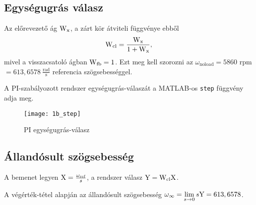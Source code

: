 
\subsection{Egységugrás válasz}

Az előrevezető ág $\mathrm{W}_\text{x}$, a zárt kör átviteli függvénye ebből
\begin{equation}
	\mathrm{W}_\text{cl} = \frac{\mathrm{W}_\text{x}}{1+\mathrm{W}_\text{x}},
\end{equation}
mivel a visszacsatoló ágban $\mathrm{W}_\text{fb}=1$.
Ezt meg kell szorozni az $\omega_\text{noload} = 5860$ rpm $ = 613,6578~\frac{\text{rad}}{\text{s}} $ referencia szögsebességgel.

A PI-szabályozott rendszer egységugrás-válaszát a MATLAB-os \verb|step| függvény adja meg.
\begin{figure}[H]
	\centering
	\texttt{[image: 1b\_step]}
	\caption{PI egységugrás-válasz}
	\label{fig:1b_step}
\end{figure}


\subsection{Állandósult szögsebesség}

A bemenet legyen $\mathrm{X} = \frac{\omega_\text{ref}}{s}$, a rendszer válasz $\mathrm{Y} = \mathrm{W}_\text{cl}\mathrm{X}$.

A végérték-tétel alapján az állandósult szögsebesség $\omega_\infty = \lim\limits_{s\rightarrow 0}s\mathrm{Y} = 613,6578$.

